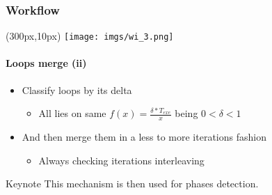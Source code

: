 \documentclass{beamer}
\begin{document}
\begin{frame}
\frametitle{Workflow}
\begin{textblock*}{5cm}(300px,10px) %
	\texttt{[image: imgs/wi\_3.png]}
\end{textblock*}
\framesubtitle{Loops merge (ii)}
\begin{itemize}
	\pause
	\item Classify loops by its delta
	\begin{itemize}
		\item All lies on same $f(x)=\frac{\delta*T_{exe}}{x}$ being $0 < \delta < 1$
	\end{itemize}
	\item And then merge them in a less to more iterations fashion
	\begin{itemize}
		\item Always checking iterations interleaving
	\end{itemize}
\end{itemize}
\pause
\pause
\begin{block}{Keynote}
	This mechanism is then used for phases detection.
\end{block}
\end{frame}
\end{document}
